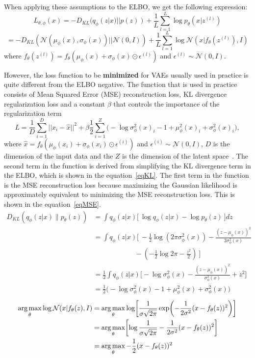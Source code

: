 When applying these assumptions to the ELBO, we get the following expression: \[ L_{\theta, \phi}(x) = - D_{KL}(q_{\phi}(z|x) || p(z)) + \frac{1}{L} \sum_{l=1}^{L} \log p_{\theta}(x|z^{(l)}) \]
\[ = - D_{KL}(\mathcal{N}(\mu_{\phi}(x), \sigma_{\phi}(x)) || \mathcal{N}(0, I)) + \frac{1}{L} \sum_{l=1}^{L} \log \mathcal{N}(x|f_{\theta}(z^{(l)}), I) \]
where $f_{\theta}(z^{(l)}) = f_{\theta}(\mu_{\phi}(x) + \sigma_{\phi}(x) \odot \epsilon^{(l)})$ and $\epsilon^{(l)} \sim \mathcal{N}(0, I)$.

However, the loss function to be \textbf{minimized} for VAEs usually used in practice is quite different from the ELBO negative. 
The function that is used in practice consists of Mean Squared Error (MSE) reconstruction loss, KL divergence regularization loss and a constant $\beta$ that controls the importance of the regularization term
\[ L = \frac{1}{D} \sum_{i=1}^{D} ||x_i - \hat{x} ||^2 + \beta  \frac{1}{2} \sum_{i=1}^{Z} \biggl( -\log \sigma^2_\phi(x)_i - 1 + \mu^2_\phi(x)_i + \sigma^2_\phi(x)_i \biggr), \]
where $\hat{x} = f_{\theta}(\mu_{\phi}(x_i) + \sigma_{\phi}(x_i) \odot \epsilon^{(i)})$ and $\epsilon^{(i)} \sim \mathcal{N}(0, I)$, $D$ is the dimension of the input data and the $Z$ is the dimension of the latent space~\cite{Kingma_2019,betavae}. The second term in the function is derived from simplifying the KL divergence term in the ELBO, which is shown in the equation~\ref{eqKL}. The first term in the function is the MSE reconstruction loss because maximizing the Gaussian likelihood is approximately equivalent to minimizing the MSE reconstruction loss. This is shown in the equation~\ref{eqMSE}.
\begin{equation} \label{eqKL}
    \begin{split}
        D_{KL}(q_\phi(z|x) \| p_\theta(z)) &= \int q_\phi(z|x) \biggl[\ \log q_\phi(z|x) - \log p_\theta(z) \ \biggr] dz \\
        &= \int q_\phi(z|x) \biggl[\ -\frac{1}{2} \log (2\pi\sigma^2_\phi(x)) - \frac{(z - \mu_\phi(x))^2}{2\sigma^2_\phi(x)} \\
        &\qquad\qquad\qquad - \left( -\frac{1}{2} \log 2\pi - \frac{z^2}{2} \right) \ \biggr] \\
        &= \frac{1}{2} \int q_\phi(z|x) \biggl[ -\log \sigma^2_\phi(x) - \frac{(z - \mu_\phi(x))^2}{\sigma^2_\phi(x)} + z^2 \biggr] \\
        &= \frac{1}{2} \biggl( -\log \sigma^2_\phi(x) - 1 + \mu^2_\phi(x) + \sigma^2_\phi(x) \biggr)
    \end{split}
\end{equation}
\begin{equation} \label{eqMSE}
    \begin{split}
        \operatorname*{arg\,max}_{\theta} \log \mathcal{N}(x|f_{\theta}(z), I) & = \operatorname*{arg\,max}_{\theta} \log \biggl[\frac{1}{\sigma \sqrt{2\pi}} \exp \biggl( -\frac{1}{2 \sigma^2} (x - f_{\theta}(z))^2 \biggr)\biggr] \\
        & = \operatorname*{arg\,max}_{\theta} \biggl[ \log \frac{1}{\sigma \sqrt{2\pi}} - \frac{1}{2 \sigma^2} (x - f_{\theta}(z))^2 \biggl]\\
        & = \operatorname*{arg\,max}_{\theta} -\frac{1}{2} (x - f_{\theta}(z))^2
    \end{split}
\end{equation}

